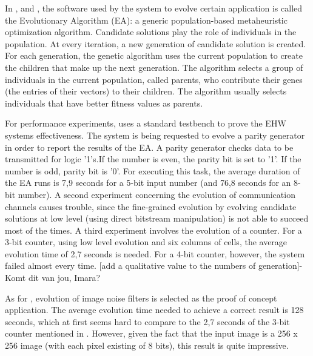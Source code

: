
In \cite{virtex4}, \cite{PDR} and  \cite{erlangen}, the software used by the system to evolve certain application is called the Evolutionary Algorithm (EA): a generic population-based metaheuristic optimization algorithm. Candidate solutions play the role of individuals in the population. At every iteration, a new generation of candidate solution is created. For each generation, the genetic algorithm uses the current population to create the children that make up the next generation. The algorithm selects a group of individuals in the current population, called parents, who contribute their genes (the entries of their vectors) to their children. The algorithm usually selects individuals that have better fitness values as parents. 

For performance experiments, \cite{virtex4} uses a standard testbench to prove the EHW systems effectiveness. The system is being requested to evolve a parity generator in order to report the results of the EA. A parity generator checks data to be transmitted for logic '1's.If the number is even, the parity bit is set to '1'. If the number is odd, parity bit is '0'. For executing this task, the average duration of the EA runs is 7,9 seconds for a 5-bit input number (and 76,8 seconds for an 8-bit number). A second experiment concerning the evolution of communication channels causes trouble, since the fine-grained evolution by evolving candidate solutions at low level (using direct bitstream manipulation) is not able to succeed most of the times. A third experiment involves the evolution of a counter. For a 3-bit counter, using low level evolution and six columns of cells, the average evolution time of 2,7 seconds is needed. For a 4-bit counter, however, the system failed almost every time. [add a qualitative value to the numbers of generation]- Komt dit van jou, Imara?

As for \cite{PDR}, evolution of image noise filters is selected as the proof of concept application. The average evolution time needed to achieve a correct result is 128 seconds, which at first seems hard to compare to the 2,7 seconds of the 3-bit counter mentioned in \cite{virtex4}. However, given the fact that the input image is a 256 x 256 image (with each pixel existing of 8 bits), this result is quite impressive. 


